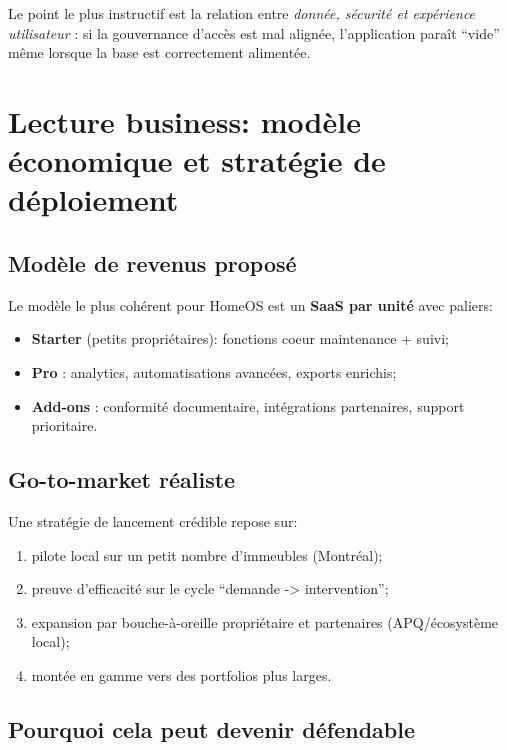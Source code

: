 \documentclass[11pt,a4paper]{article}
\begin{document}
Le point le plus instructif est la relation entre \textit{donnée, sécurité et expérience utilisateur} : si la gouvernance d'accès est mal alignée, l'application paraît ``vide'' même lorsque la base est correctement alimentée.

\section{Lecture business: modèle économique et stratégie de déploiement}

\subsection{Modèle de revenus proposé}

Le modèle le plus cohérent pour HomeOS est un \textbf{SaaS par unité} avec paliers:

\begin{itemize}[leftmargin=1.4em]
  \item \textbf{Starter} (petits propriétaires): fonctions coeur maintenance + suivi;
  \item \textbf{Pro} : analytics, automatisations avancées, exports enrichis;
  \item \textbf{Add-ons} : conformité documentaire, intégrations partenaires, support prioritaire.
\end{itemize}

\subsection{Go-to-market réaliste}

Une stratégie de lancement crédible repose sur:

\begin{enumerate}[leftmargin=1.4em]
  \item pilote local sur un petit nombre d'immeubles (Montréal);
  \item preuve d'efficacité sur le cycle ``demande -> intervention'';
  \item expansion par bouche-à-oreille propriétaire et partenaires (APQ/écosystème local);
  \item montée en gamme vers des portfolios plus larges.
\end{enumerate}

\subsection{Pourquoi cela peut devenir défendable}
\end{document}
